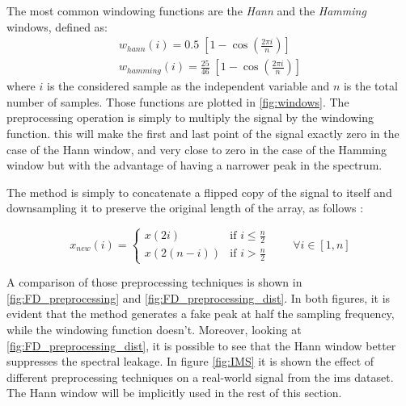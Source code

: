 The most common windowing functions are the \emph{Hann} and the \emph{Hamming} windows, defined as:
\begin{eqnarray}
    w_{hann}(i) = 0.5\; \left[1 - \cos \left ( \frac{2 \pi i}{n} \right) \right] \\
    w_{hamming}(i) = \frac{25}{46}\; \left[1 - \cos \left ( \frac{2 \pi i}{n} \right) \right]
\end{eqnarray}
where $i$ is the considered sample as the independent variable and $n$ is the total number of samples. Those functions are plotted in \autoref{fig:windows}. The preprocessing operation is simply to multiply the signal by the windowing function. this will make the first and last point of the signal exactly zero in the case of the Hann window, and very close to zero in the case of the Hamming window but with the advantage of having a narrower peak in the spectrum. 

The  method is simply to concatenate a flipped copy of the signal to itself and downsampling it to preserve the original length of the array, as follows \cite{Preprocessing}:

\begin{equation}
    x_{new}(i) = \begin{cases}
        x(2i) & \text{if } i \leq \frac{n}{2} \\
        x(2(n-i)) & \text{if } i > \frac{n}{2}
    \end{cases} \qquad \forall i \in [1,n]
\end{equation}

A comparison of those preprocessing techniques is shown in \autoref{fig:FD_preprocessing} and \autoref{fig:FD_preprocessing_dist}. In both figures, it is evident that the  method generates a fake peak at half the sampling frequency, while the windowing function doesn't. Moreover, looking at \autoref{fig:FD_preprocessing_dist}, it is possible to see that the Hann window better suppresses the spectral leakage.
In figure \autoref{fig:IMS} it is shown the effect of different preprocessing techniques on a real-world signal from the \gls{ims} dataset. The Hann window will be implicitly used in the rest of this section.



